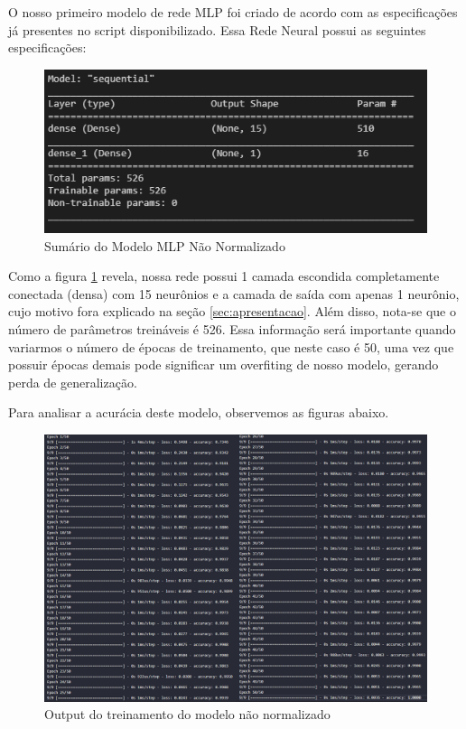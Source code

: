 \documentclass[12pt]{article}
\begin{document}
O nosso primeiro modelo de rede MLP foi criado de acordo com as especificações já presentes no script disponibilizado. Essa Rede Neural possui as seguintes especificações:

\begin{figure}[H]
	\centering
	\includegraphics[width=0.7\linewidth]{Imagens/SumarioModeloNaoNormalziado}
	\caption{Sumário do Modelo MLP Não Normalizado}
	\label{fig:sumariomodelonaonormalziado}
\end{figure}

Como a figura \ref{fig:sumariomodelonaonormalziado} revela, nossa rede possui 1 camada escondida completamente conectada (densa) com 15 neurônios e a camada de saída com apenas 1 neurônio, cujo motivo fora explicado na seção \ref{sec:apresentacao}. Além disso, nota-se que o número de parâmetros treináveis é 526. Essa informação será importante quando variarmos o número de épocas de treinamento, que neste caso é 50, uma vez que possuir épocas demais pode significar um overfiting de nosso modelo, gerando perda de generalização. 

Para analisar a acurácia deste modelo, observemos as figuras abaixo.

\begin{figure}[H]
	\centering
	\includegraphics[width=1.1\linewidth]{Imagens/Fit_NaoNormalizado}
	\caption{Output do treinamento do modelo não normalizado}
	\label{fig:fitnaonormalizado}
\end{figure}
\end{document}
